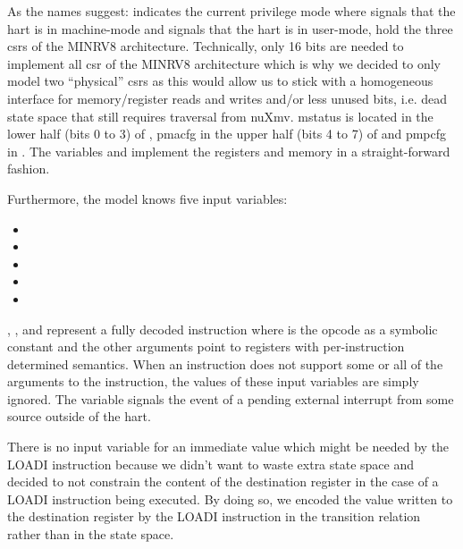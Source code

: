 As the names suggest:  indicates the current privilege mode where  signals that the \gls{hart} is in machine-mode and  signals that the \gls{hart} is in user-mode,  hold the three \glspl{csr} of the MINRV8 architecture.
Technically, only 16 bits are needed to implement all \gls{csr} of the MINRV8 architecture which is why we decided to only model two \enquote{physical} \glspl{csr} as this would allow us to stick with a homogeneous interface for memory/register reads and writes and/or less unused bits, i.e. dead state space that still requires traversal from nuXmv.
\gls{mstatus} is located in the lower half (bits 0 to 3) of , \gls{pmacfg} in the upper half (bits 4 to 7) of  and \gls{pmpcfg} in .
The variables  and  implement the registers and memory in a straight-forward fashion.

Furthermore, the model knows five input variables:
\begin{itemize}
    \item {}
    \item {}
    \item {}
    \item {}
    \item {}
\end{itemize}

, ,  and  represent a fully decoded instruction where  is the opcode as a symbolic constant and the other arguments point to registers with per-instruction determined semantics.
When an instruction does not support some or all of the arguments to the instruction, the values of these input variables are simply ignored.
The variable  signals the event of a pending external interrupt from some source outside of the \gls{hart}.

There is no input variable for an immediate value which might be needed by the LOADI instruction because we didn't want to waste extra state space and decided to not constrain the content of the destination register in the case of a LOADI instruction being executed.
By doing so, we encoded the value written to the destination register by the LOADI instruction in the transition relation rather than in the state space.

